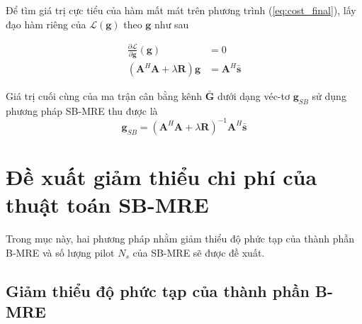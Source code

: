 Để tìm giá trị cực tiểu của hàm mất mát trên phương trình (\ref{eq:cost_final}), lấy đạo hàm riêng của $\mathcal{L}(\mathbf{g})$ theo $\mathbf{g}$ như sau 

\begin{equation}
\begin{aligned}
\frac{\partial \mathcal{L}}{\partial \mathbf{g}}(\mathbf{g}) &= 0 \\
\left(\mathbf{A}^H \mathbf{A}+\lambda \mathbf{R}\right) \mathbf{g} &= \mathbf{A}^H \bar{\mathbf{s}}
\end{aligned}
\end{equation}

Giá trị cuối cùng của ma trận cân bằng kênh $\bar{\mathbf{G}}$ dưới dạng véc-tơ $\mathbf{g}_{SB}$ sử dụng phương pháp SB-MRE thu được là
\begin{equation}
    \mathbf{g}_{SB}=\left(\mathbf{A}^H \mathbf{A} + \lambda \mathbf{R}\right)^{-1} \mathbf{A}^H \bar{\mathbf{s}}
\end{equation}

\section{Đề xuất giảm thiểu chi phí của thuật toán SB-MRE}

Trong mục này, hai phương pháp nhằm giảm thiểu độ phức tạp của thành phần B-MRE và số lượng pilot $N_s$ của SB-MRE sẽ được đề xuất.

\subsection{Giảm thiểu độ phức tạp của thành phần B-MRE}

